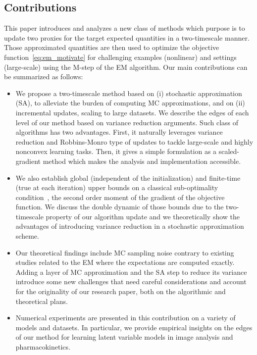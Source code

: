 \documentclass[12pt]{article}
\begin{document}
\subsection{Contributions}
This paper introduces and analyzes a new class of methods which purpose is to update two proxies for the target expected quantities in a two-timescale manner. 
Those approximated quantities are then used to optimize the objective function~\eqref{eq:em_motivate} for challenging examples (nonlinear) and settings (large-scale) using the {M-step} of the EM algorithm.
Our main contributions can be summarized as follows:
\begin{itemize}
\item We propose a two-timescale method based on (i) stochastic approximation (SA), to alleviate the burden of computing MC approximations, and on (ii) incremental updates, scaling to large datasets. We describe the edges of each level of our method based on variance reduction arguments. Such class of algorithms has two advantages. First, it naturally leverages variance reduction and Robbins-Monro type of updates to tackle large-scale and highly nonconvex learning tasks. Then, it gives a simple formulation as a {scaled-gradient method} which makes the analysis and implementation accessible.
\item We also establish global (independent of the initialization) and finite-time (true at each iteration) upper bounds on a classical sub-optimality condition~\citep{jain2017non, ghadimi2013stochastic}, \ie the second order moment of the gradient of the objective function. 
We discuss the double dynamic of those bounds due to the two-timescale property of our algorithm update and we theoretically show the advantages of introducing variance reduction in a {stochastic approximation}~\citep{robbins1951stochastic} scheme.
\item Our theoretical findings include MC sampling noise contrary to existing studies related to the EM where the expectations are computed exactly. 
Adding a layer of MC approximation and the SA step to reduce its variance introduce some new challenges that need careful considerations and account for the originality of our research paper, both on the algorithmic and theoretical plans.
\item Numerical experiments are presented in this contribution on a variety of models and datasets. 
In particular, we provide empirical insights on the edges of our method for learning latent variable models in image analysis and pharmacokinetics.
\end{itemize}
\end{document}
